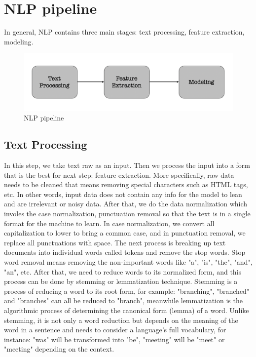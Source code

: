 \documentclass[a4paper,12pt]{report}
\begin{document}
    \section{NLP pipeline}
    In general, NLP contains three main stages: text processing, feature extraction, modeling\cite{IntroNLP}.
    \begin{figure}[!h]
        \includegraphics[width=\linewidth]{nlp_pipeline.png}
        \centering
        \caption{NLP pipeline}
    \end{figure}

    \subsection{Text Processing}
    In this step, we take text raw as an input. Then we process the input into a form that is the best for next step: feature extraction.
    More specifically, raw data needs to be cleaned that means removing special characters such as HTML tags, etc. In other words, input data does not contain any info for the model to lean and are irrelevant or noisy data.
    After that, we do the data normalization which involes the case normalization, punctuation removal so that the text is in a single format for the machine to learn.
    In case normalization, we convert all capitalization to lower to bring a common case, 
    and in punctuation removal, we replace all punctuations with space.
    The next process is breaking up text documents into individual words called tokens and remove the stop words.
    Stop word removal means removing the non-important words like "a", "is", "the", "and", "an", etc. 
    \newline\newline
    After that, we need to reduce words to its normalized form, and this process can be done by stemming or lemmatization technique.
    Stemming is a process of reducing a word to its root form, for example: "branching", "branched" and "branches" can all be reduced to "branch", 
    meanwhile lemmatization is the algorithmic process of determining the canonical
    form (lemma) of a word.
    Unlike stemming, it is not only a word reduction but depends on the
    meaning of the word in a sentence and needs to consider a language’s
    full vocabulary, for instance: "was" will be transformed into "be", "meeting" will be "meet" or "meeting" depending on the context.
\end{document}
